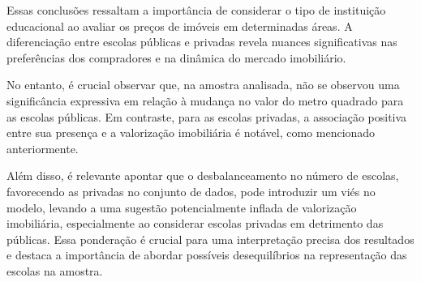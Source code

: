 Essas conclusões ressaltam a importância de considerar o tipo de instituição educacional ao avaliar os preços de imóveis em determinadas áreas. A diferenciação entre escolas públicas e privadas revela nuances significativas nas preferências dos compradores e na dinâmica do mercado imobiliário.

No entanto, é crucial observar que, na amostra analisada, não se observou uma significância expressiva em relação à mudança no valor do metro quadrado para as escolas públicas. Em contraste, para as escolas privadas, a associação positiva entre sua presença e a valorização imobiliária é notável, como mencionado anteriormente.

Além disso, é relevante apontar que o desbalanceamento no número de escolas, favorecendo as privadas no conjunto de dados, pode introduzir um viés no modelo, levando a uma sugestão potencialmente inflada de valorização imobiliária, especialmente ao considerar escolas privadas em detrimento das públicas. Essa ponderação é crucial para uma interpretação precisa dos resultados e destaca a importância de abordar possíveis desequilíbrios na representação das escolas na amostra.

\printbibliography[keyword = {escolas}]



